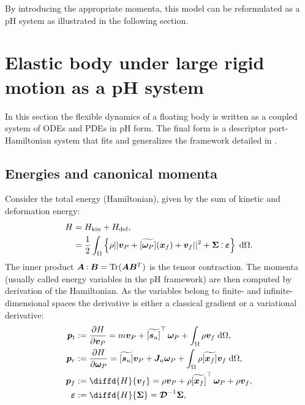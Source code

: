 \documentclass{svjour3}                     %
\DeclareMathOperator{\Tr}{Tr}
\newcommand{\crmat}[1]{\ensuremath{\widetilde{\left[#1\right]}}}
\def\onedot{$\mathsurround0pt\ldotp$}
\def\cddot{%
	\mathbin{\vcenter{\baselineskip.67ex
			\hbox{\onedot}\hbox{\onedot}}%
}}
\begin{document}
 By introducing the appropriate momenta, this model can be reformulated as a pH system as illustrated in the following section.


\section{Elastic body under large rigid motion as a pH system}
\label{sec:pH_fd}
In this section the flexible dynamics of a floating body is written as a coupled system of ODEs and PDEs in pH form. The final form is a descriptor port-Hamiltonian system that fits and generalizes the framework detailed in \cite{beattie2018linear,mehrmann2019structurepreserving}.  

\subsection{Energies and canonical momenta}
Consider the total energy (Hamiltonian), given by the sum of kinetic and deformation energy:
\begin{equation}
\label{eq:H}
\begin{aligned}
H &= H_{\text{kin}} + H_{\text{def}}, \\
&= \frac{1}{2} \int_{\Omega} \left\{\rho ||\bm{v}_P + \crmat{\bm{\omega}_P} (\bm{x}_f) + {\bm{v}}_f||^2 + \bm\Sigma \cddot \bm\varepsilon \right\}  \d{\Omega}.
\end{aligned}
\end{equation}
The inner product $\bm{A} \cddot \bm{B} = \Tr(\bm{A} \bm{B}^T)$ is the tensor contraction.  
The momenta (usually called energy variables in the pH framework) are then computed by derivation of the Hamiltonian. As the variables belong to finite- and infinite-dimensional spaces the derivative is either a classical gradient or a variational derivative:
\begin{equation}
\label{eq:momenta}
\begin{aligned}
\bm{p}_t &:= \diffp{H}{\bm{v}_P} = m \bm{v}_P + \crmat{\bm{s}_u}^\top \, \bm\omega_P + \int_{\Omega} \rho \bm{v}_f \d{\Omega}, \\
\bm{p}_r &:= \diffp{H}{\bm\omega_P} = \crmat{\bm{s}_u} \bm{v}_P + \bm{J}_u \bm\omega_P + \int_{\Omega} \rho \crmat{\bm{x}_f} \bm{v}_f \d{\Omega}, \\
\bm{p}_f &:= \diffd{H}{\bm{v}_f} = \rho \bm{v}_P + \rho \crmat{\bm{x}_f}^\top \, \bm\omega_P + \rho \bm{v}_f, \\
\bm\varepsilon &:= \diffd{H}{\bm\Sigma} = \bm{\mathcal{D}}^{-1} \bm\Sigma,
\end{aligned}
\end{equation}
\end{document}
